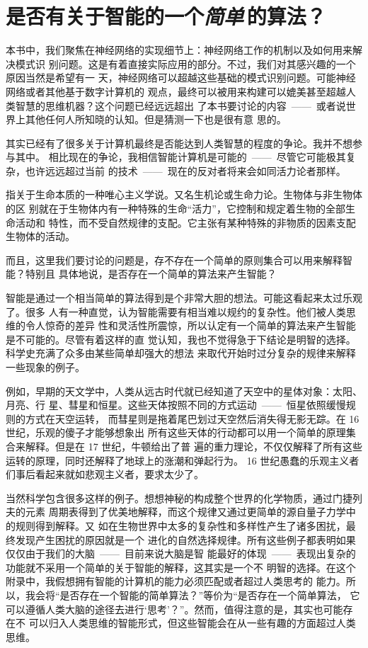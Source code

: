 
\chapter{是否有关于智能的一个\emph{简单}\,的算法？}

本书中，我们聚焦在神经网络的实现细节上：神经网络工作的机制以及如何用来解决模式识
别问题。这是有着直接实际应用的部分。不过，我们对其感兴趣的一个原因当然是希望有一
天，神经网络可以超越这些基础的模式识别问题。可能神经网络或者其他基于数字计算机的
观点，最终可以被用来构建可以媲美甚至超越人类智慧的思维机器？这个问题已经远远超出
了本书要讨论的内容~——~或者说世界上其他任何人所知晓的认知。但是猜测一下也是很有意
思的。

其实已经有了很多关于计算机最终是否能达到人类智慧的程度的争论。我并不想参与其中。
相比现在的争论，我相信智能计算机是可能的~——~尽管它可能极其复杂，也许远远超过当前
的技术~——~现在的反对者将来会如同活力论者那样。

    指关于生命本质的一种唯心主义学说。又名生机论或生命力论。生物体与非生物体的区
    别就在于生物体内有一种特殊的生命“活力”，它控制和规定着生物的全部生命活动和
    特性，而不受自然规律的支配。它主张有某种特殊的非物质的因素支配生物体的活动。

而且，这里我们要讨论的问题是，存不存在一个简单的原则集合可以用来解释智能？特别且
具体地说，是否存在一个简单的算法来产生智能？

智能是通过一个相当简单的算法得到是个非常大胆的想法。可能这看起来太过乐观了。很多
人有一种直觉，认为智能需要有相当难以规约的复杂性。他们被人类思维的令人惊奇的差异
性和灵活性所震惊，所以认定有一个简单的算法来产生智能是不可能的。尽管有着这样的直
觉认知，我也不觉得急于下结论是明智的选择。科学史充满了众多由某些简单却强大的想法
来取代开始时过分复杂的规律来解释一些现象的例子。

例如，早期的天文学中，人类从远古时代就已经知道了天空中的星体对象：太阳、月亮、行
星、彗星和恒星。这些天体按照不同的方式运动~——~恒星依照缓慢规则的方式在天空运转，
而彗星则是拖着尾巴划过天空然后消失得无影无踪。在 16 世纪，乐观的傻子才能够想象出
所有这些天体的行动都可以用一个简单的原理集合来解释。但是在 17 世纪，牛顿给出了普
遍的重力理论，不仅仅解释了所有这些运转的原理，同时还解释了地球上的涨潮和弹起行为。
16 世纪愚蠢的乐观主义者们事后看起来就如悲观主义者，要求太少了。

当然科学包含很多这样的例子。想想神秘的构成整个世界的化学物质，通过门捷列夫的元素
周期表得到了优美地解释，而这个规律又通过更简单的源自量子力学中的规则得到解释。又
如在生物世界中太多的复杂性和多样性产生了诸多困扰，最终发现产生困扰的原因就是一个
进化的自然选择规律。所有这些例子都表明如果仅仅由于我们的大脑~——~目前来说大脑是智
能最好的体现~——~表现出复杂的功能就不采用一个简单的关于智能的解释，这其实是一个不
明智的选择。在这个附录中，我假想拥有智能的计算机的能力必须匹配或者超过人类思考的
能力。所以，我会将“是否存在一个智能的简单算法？”等价为“是否存在一个简单算法，
它可以遵循人类大脑的途径去进行‘思考’？”。然而，值得注意的是，其实也可能存在不
可以归入人类思维的智能形式，但这些智能会在从一些有趣的方面超过人类思维。

